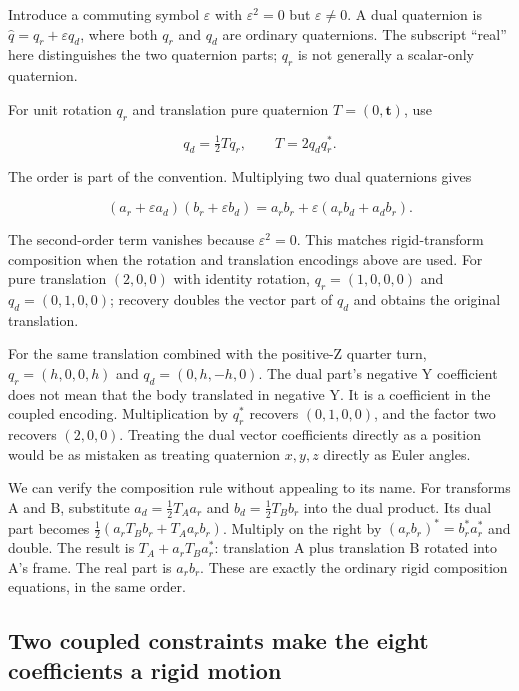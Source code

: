 Introduce a commuting symbol \(\varepsilon\) with \(\varepsilon^2=0\) but \(\varepsilon\ne0\). A dual quaternion is \(\widehat q=q_r+\varepsilon q_d\), where both \(q_r\) and \(q_d\) are ordinary quaternions. The subscript ``real'' here distinguishes the two quaternion parts; \(q_r\) is not generally a scalar-only quaternion.

For unit rotation \(q_r\) and translation pure quaternion \(T=(0,\mathbf t)\), use

\[
q_d=\tfrac12Tq_r,\qquad T=2q_dq_r^*.
\]

The order is part of the convention. Multiplying two dual quaternions gives

\[
(a_r+\varepsilon a_d)(b_r+\varepsilon b_d)
=a_rb_r+\varepsilon(a_rb_d+a_db_r).
\]

The second-order term vanishes because \(\varepsilon^2=0\). This matches rigid-transform composition when the rotation and translation encodings above are used. For pure translation \((2,0,0)\) with identity rotation, \(q_r=(1,0,0,0)\) and \(q_d=(0,1,0,0)\); recovery doubles the vector part of \(q_d\) and obtains the original translation.

For the same translation combined with the positive-Z quarter turn, \(q_r=(h,0,0,h)\) and \(q_d=(0,h,-h,0)\). The dual part's negative Y coefficient does not mean that the body translated in negative Y. It is a coefficient in the coupled encoding. Multiplication by \(q_r^*\) recovers \((0,1,0,0)\), and the factor two recovers \((2,0,0)\). Treating the dual vector coefficients directly as a position would be as mistaken as treating quaternion \(x,y,z\) directly as Euler angles.

We can verify the composition rule without appealing to its name. For transforms A and B, substitute \(a_d=\tfrac12T_Aa_r\) and \(b_d=\tfrac12T_Bb_r\) into the dual product. Its dual part becomes \(\tfrac12(a_rT_Bb_r+T_Aa_rb_r)\). Multiply on the right by \((a_rb_r)^*=b_r^*a_r^*\) and double. The result is \(T_A+a_rT_Ba_r^*\): translation A plus translation B rotated into A's frame. The real part is \(a_rb_r\). These are exactly the ordinary rigid composition equations, in the same order.

\subsection{Two coupled constraints make the eight coefficients a rigid motion}\label{01-foundations-i-ch019-two-coupled-constraints-make-the-eight-coefficients-a-rigid-motion}

